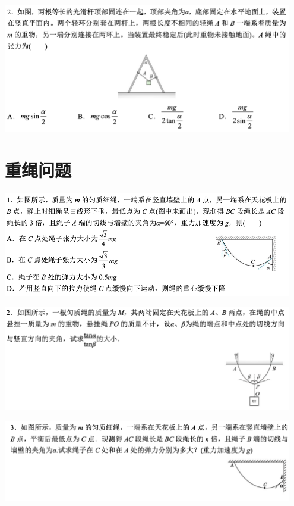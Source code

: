 \documentclass{article}
\begin{document}
\includegraphics[width = 0.95\textwidth]{./pictures/3-2.png}

\vspace{5em}

\section{重绳问题}
\includegraphics[width = 0.95\textwidth]{./pictures/4-1.png}

\vspace{5em}

\includegraphics[width = 0.95\textwidth]{./pictures/4-2.png}

\vspace{5em}

\includegraphics[width = 0.95\textwidth]{./pictures/4-3.png}
\end{document}
